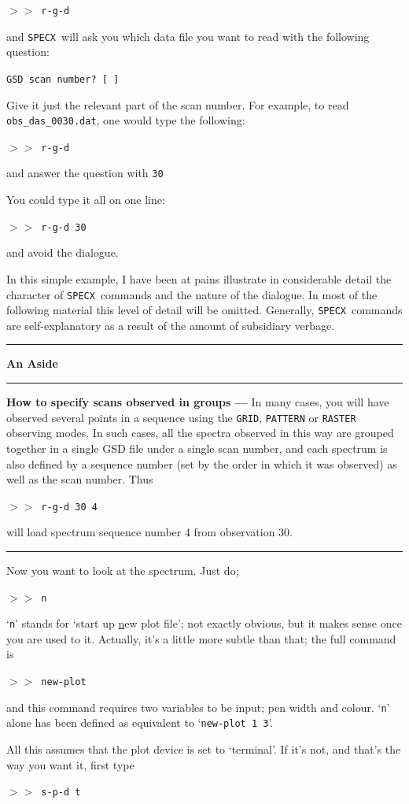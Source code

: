 \documentclass[11pt,twoside]{article}
\newcommand{\SPECX}{{\tt SPECX}}
\newcommand{\SP}{{$>\!>$}}
\newcommand{\aside}
{\begin{center}\rule[1mm]{1.0in}{0.015in}\hspace*{2mm}
{\bf An Aside}
\hspace*{2mm}\rule[1mm]{1.0in}{0.015in}\end{center}\vspace*{-0.2in}}
\newcommand{\myline}
{\vspace*{-0.2in}\begin{center}\rule{3.0in}{0.015in}\end{center}}
\begin{document}
\SP\ {\tt r-g-d}

and \SPECX\ will ask you which data file you want to read with the
following question:

{\tt GSD scan number? [ ]}

Give it just the relevant part of the scan number.  For example, to
read {\tt obs\_das\_0030.dat}, one would type the following:

\SP\ {\tt r-g-d}

and answer the question with {\tt 30}

You could type it all on one line:

\SP\ {\tt r-g-d 30}

and avoid the dialogue.

In this simple example, I have been at pains illustrate in
considerable detail the character of \SPECX\ commands and the nature
of the dialogue. In most of the following material this level of
detail will be omitted. Generally, \SPECX\ commands are
self-explanatory as a result of the amount of subsidiary verbage.

\aside
{\bf How to specify scans observed in groups --- } In many cases, you
will have observed several points in a sequence using the {\tt GRID},
{\tt PATTERN} or {\tt RASTER} observing modes. In such cases, all the
spectra observed in this way are grouped together in a single GSD file
under a single scan number, and each spectrum is also defined by a
sequence number (set by the order in which it was observed) as well as
the scan number.  Thus

\SP\ {\tt r-g-d 30 4}

will load spectrum sequence number 4 from observation 30.
\myline

Now you want to look at the spectrum.  Just do;

\SP\ {\tt n}

`{\tt{n}}' stands for `start up \underline{n}ew plot file'; not exactly
obvious, but it makes sense once you are used to it. Actually, it's a
little more subtle than that; the full command is

\SP\ {\tt new-plot}

and this command requires two variables to be input; pen width and
colour. `{\tt{n}}' alone has been defined as equivalent to
`{\tt{new-plot 1 3}}'.

All this assumes that the plot device is set to `terminal'. If it's not,
and that's the way you want it, first type

\SP\ {\tt s-p-d t}
\end{document}
